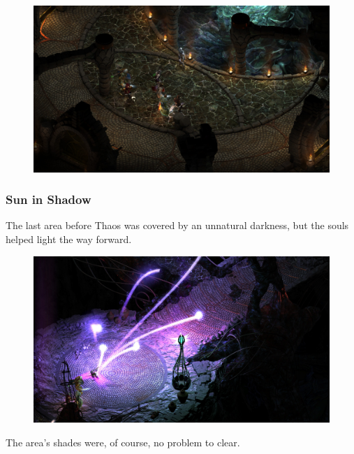 \documentclass{article}
\begin{document}
\begin{figure}
\includegraphics[scale=0.33]{files/blog/2019_03_17_pillars_of_eternity_path_of_the_damned_act_iv/2019_03_17_breith_eaman2.jpg}
\end{figure}

\subsubsection{Sun in Shadow}

The last area before Thaos was covered by an unnatural darkness, but the souls helped light the way forward.

\begin{figure}
\includegraphics[scale=0.33]{files/blog/2019_03_17_pillars_of_eternity_path_of_the_damned_act_iv/2019_03_17_sun_in_shadow1.jpg}
\end{figure}

The area's shades were, of course, no problem to clear.
\end{document}
